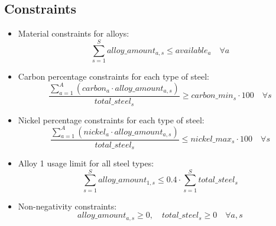 \documentclass{article}
\begin{document}
\subsection*{Constraints}
\begin{itemize}
    \item Material constraints for alloys:
    \[
    \sum_{s=1}^{S} alloy\_amount_{a,s} \leq available_a \quad \forall a
    \]

    \item Carbon percentage constraints for each type of steel:
    \[
    \frac{\sum_{a=1}^{A} (carbon_{a} \cdot alloy\_amount_{a,s})}{total\_steel_{s}} \geq carbon\_min_{s} \cdot 100 \quad \forall s
    \]

    \item Nickel percentage constraints for each type of steel:
    \[
    \frac{\sum_{a=1}^{A} (nickel_{a} \cdot alloy\_amount_{a,s})}{total\_steel_{s}} \leq nickel\_max_{s} \cdot 100 \quad \forall s
    \]

    \item Alloy 1 usage limit for all steel types:
    \[
    \sum_{s=1}^{S} alloy\_amount_{1,s} \leq 0.4 \cdot \sum_{s=1}^{S} total\_steel_{s}
    \]

    \item Non-negativity constraints:
    \[
    alloy\_amount_{a,s} \geq 0, \quad total\_steel_{s} \geq 0 \quad \forall a, s
    \]
\end{itemize}
\end{document}
